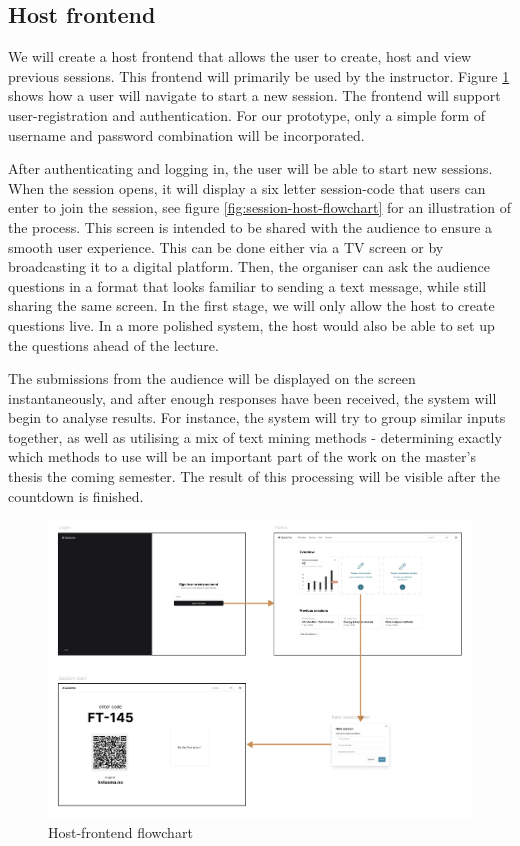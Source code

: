 \subsection{Host frontend}
We will create a host frontend that allows the user to create, host and view previous sessions. This frontend will primarily be used by the instructor. Figure \ref{fig:host-frontend-flow} shows how a user will navigate to start a new session. The frontend will support user-registration and authentication. For our prototype, only a simple form of username and password combination will be incorporated.

After authenticating and logging in, the user will be able to start new sessions. When the session opens, it will display a six letter session-code that users can enter to join the session, see figure \ref{fig:session-host-flowchart} for an illustration of the process. This screen is intended to be shared with the audience to ensure a smooth user experience. This can be done either via a TV screen or by broadcasting it to a digital platform. Then, the organiser can ask the audience questions in a format that looks familiar to sending a text message, while still sharing the same screen. In the first stage, we will only allow the host to create questions live. In a more polished system, the host would also be able to set up the questions ahead of the lecture.

The submissions from the audience will be displayed on the screen instantaneously, and after enough responses have been received, the system will begin to analyse results. For instance, the system will try to group similar inputs together, as well as utilising a mix of text mining methods - determining exactly which methods to use will be an important part of the work on the master's thesis the coming semester. The result of this processing will be visible after the countdown is finished.

\clearpage
\begin{figure}[h!]
    \centering
    \includegraphics[width=1\linewidth]{figures//c5/host-frontend.png}
    \caption{Host-frontend flowchart}
    \label{fig:host-frontend-flow}
\end{figure}

